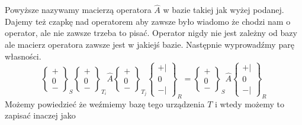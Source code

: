 Powyższe nazywamy macierzą operatora $\hat{A}$ w bazie takiej jak wyżej podanej. Dajemy też czapkę nad operatorem aby zawsze było wiadomo że chodzi nam o operator, ale nie zawsze trzeba to pisać. Operator nigdy nie jest zależny od bazy ale macierz operatora zawsze jest w jakiejś bazie.
Następnie wyprowadźmy parę własności.
\begin{equation*}
	\left\{\begin{array}{lr}
		+ \\
		0  \\
		- 
	\end{array}\right\}_{S} 
	\left\{\begin{array}{lr}
		+ \\
		0 \\
		- 
	\end{array}\right\}_{T_i}
	\hat{A}
	\left\{\begin{array}{lr}
		+ \\
		0  \\
		- 
	\end{array}\right\}_{T_j} 
	\left\{\begin{array}{lr}
		+ \vert \\
		0 \\
		- \vert
	\end{array}\right\}_{R}
	=
	\left\{\begin{array}{lr}
		+ \\
		0  \\
		- 
	\end{array}\right\}_{S} 
	\hat{A}
	\left\{\begin{array}{lr}
		+ \vert \\
		0 \\
		- \vert
	\end{array}\right\}_{R}
\end{equation*}
Możemy powiedzieć że weźmiemy bazę tego urządzenia $T$ i wtedy możemy to zapisać inaczej jako

